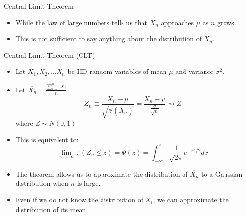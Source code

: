 \documentclass[handout]{beamer}
\begin{document}
\begin{frame}{Central Limit Theorem}
\scriptsize{
\begin{itemize}
 \item  While the law of large numbers tells us that  $\overline{X_{n}}$ approaches $\mu$ as $n$ grows.
 \item This is not sufficient to say anything about the distribution of  $\overline{X_{n}}$.
\end{itemize}

\begin{block}{Central Limit Theorem (CLT)}
\begin{itemize}
 \item Let $X_{1},X_{2},\dots X_{n}$ be IID random variables of mean $\mu$ and variance $\sigma^2$.
 \item Let $\overline{X_{n}}=\frac{\sum_{i=1}^{n} X_i}{n}$
\begin{displaymath}
 Z_{n} \equiv \frac{\overline{X_{n}}-\mu}{\sqrt{\mathbb{V}(\overline{X_{n}})}}=\frac{\overline{X_{n}}-\mu}{\frac{\sigma}{\sqrt{n}}}  \rightsquigarrow Z
\end{displaymath}
where $Z\sim N(0,1)$
\item This is equivalent to:
\begin{displaymath}
 \lim_{n\rightarrow \infty} \mathbb{P}(Z_{n} \leq z) = \Phi(z) = \int_{-\infty}^{z}\frac{1}{\sqrt{2\pi}}e^{-x^2/2}dx
\end{displaymath}
\end{itemize}
\end{block}
\begin{itemize}
 \item The theorem allows us to approximate the distribution of $\overline{X_{n}}$ to a Gaussian distribution when $n$ is large. 
 \item Even if we do not know the distribution of $X_{i}$, we can approximate the distribution of its mean.
\end{itemize}



} 
\end{frame}
\end{document}
